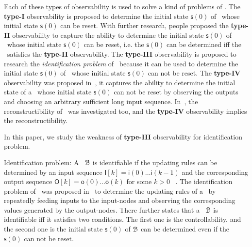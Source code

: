 Each of these types of observability is used to solve a kind of problems of \BCNs. The {\bf type-I}  observability is proposed to determine the initial state $\mathsf{s}(0)$ of \BCN\ whose initial state $\mathsf{s}(0)$ can be reset. %
 With further research, people proposed the {\bf type-II} observability to capture the ability to determine the initial state $\mathsf{s}(0)$ of \BCN\ whose initial state $\mathsf{s}(0)$ can be reset, i.e. the $\mathsf{s}(0)$ can be determined iff the \BCN\ satisfies the {\bf type-II} observability. The {\bf type-III} observability is proposed to research the {\em identification problem} of \BCN\ because it can be used to determine the initial state $\mathsf{s}(0)$ of \BCN\ whose initial state $\mathsf{s}(0)$ can not be reset. The {\bf type-IV} observability was proposed in~\cite{Fornasini2013Observability}, it captures the ability to determine the initial state of a \BCN\ whose initial state $\mathsf{s}(0)$ can not be reset by observing the outputs and choosing an arbitrary sufficient long input sequence. In~\cite{Fornasini2013Observability}, the reconstructibility of \BCNs\ was investigated too, and the {\bf type-IV} observability implies the reconstructibility. %

In this paper, we study the weakness of {\bf type-III} observability for identification problem.

Identification problem: A \BCN\ ${\mathcal{B}}$ is identifiable if the updating rules can be determined by an input sequence $\mathsf{I}[k]=\mathsf{i}(0)\ldots\mathsf{i}(k-1)$ and the corresponding output sequence $\mathsf{O}[k]=\mathsf{o}(0)\ldots\mathsf{o}(k)$ for some $k>0$~ \cite{Cheng2011Identification}. The identification problem of \BCNs\ was proposed in~\cite{Cheng2011Identification} to determine the updating rules of a \BCN\ by repeatedly feeding inputs to the input-nodes and observing the corresponding values generated by the output-nodes. 
There further states that a \BCN\ ${\mathcal{B}}$ is identifiable iff it satisfies two conditions. The first one is the controllability, and the second one is the initial state $\mathsf{s}(0)$ of ${\mathcal{B}}$ can be determined even if the $\mathsf{s}(0)$ can not be reset. %


